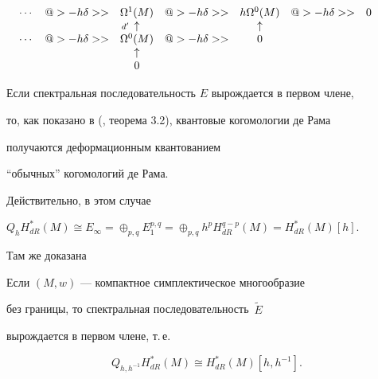 \begin{equation}
\begin{matrix}
\dotsb & @>{-h\delta}>> & \Omega^{1}(M) & @>{-h\delta}>> &


h\Omega^{0}(M) &  @>{-h\delta}>> & 0 & & \\


%


& & \UP & & \uparrow & & & & \\


%


\dotsb & @>{-h\delta}>> & \Omega^{0}(M) & @>{-h\delta}>> & 0 & & & & \\


%


& & \uparrow & & & & & & \\


%


& & 0 & & & & & & \\


\end{matrix}


\end{equation}





Если спектральная последовательность $E$ вырождается в первом члене,


то, как показано в (\cite{C-Zh}, теорема 3.2), квантовые когомологии де Рама


получаются деформационным квантованием


``обычных'' когомологий де Рама.


Действительно, в этом случае


$Q_hH_{dR}^*(M) \cong E_\infty =


\oplus_{p,q} E^{p,q}_1 =


\oplus_{p,q} h^p H^{q-p}_{dR}(M) =


H^*_{dR}(M)[h]$.





Там же доказана








\begin{thms}


Если $(M,w)$ --- компактное симплектическое многообразие


без границы, то спектральная последовательность~$\widetilde E$


вырождается в первом члене, т.\,е.


$$


Q_{h, h^{-1}}H_{dR}^*(M)\cong


H^*_{dR}(M) [h,h^{-1}].


$$


\end{thms}





